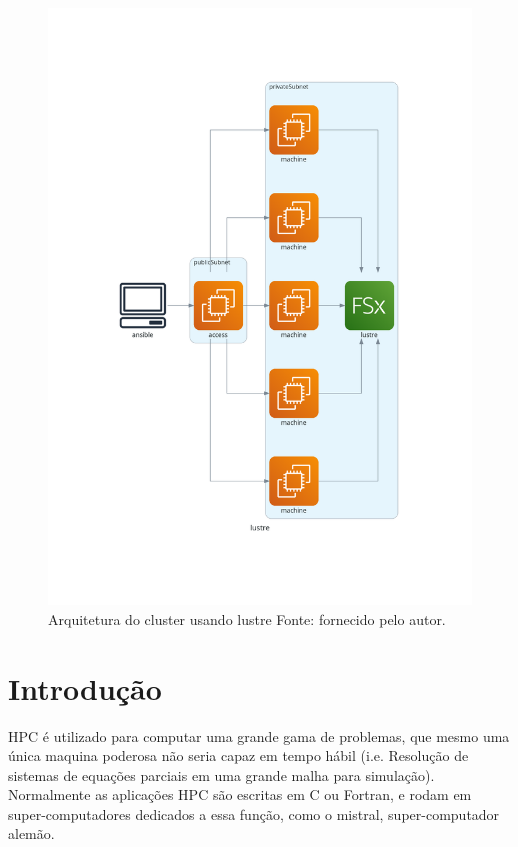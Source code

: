 \documentclass[article,a4paper,12pt,brazil,sumario=tradicional]{abntex2}
\begin{document}
\begin{figure}[!ht]
	\centering
	\includegraphics[width=1\textwidth]{lustre.png}
	\caption{Arquitetura do cluster usando lustre Fonte: fornecido pelo autor.}
	\label{fig:lustre}
\end{figure}

\section{Introdução}

HPC é utilizado para computar uma grande gama de problemas, que mesmo uma única maquina poderosa não seria capaz em tempo hábil (i.e. Resolução de sistemas de equações parciais em uma grande malha para simulação). Normalmente as aplicações HPC são escritas em C ou Fortran, e rodam em super-computadores dedicados a essa função, como o mistral, super-computador alemão.
\end{document}
